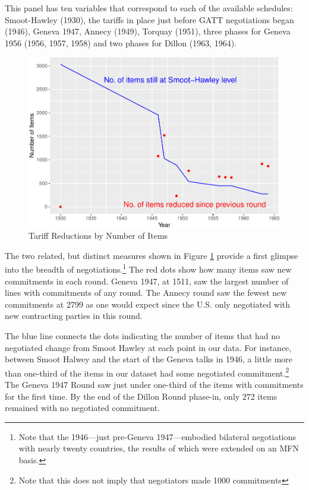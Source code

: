 \documentclass[
  12pt,
]{article}
\begin{document}
This panel has ten variables that correspond to each of the available schedules: Smoot-Hawley (1930), the tariffs in place just before GATT negotiations began (1946), Geneva 1947, Annecy (1949), Torquay (1951), three phases for Geneva 1956 (1956, 1957, 1958) and two phases for Dillon (1963, 1964).

\begin{figure}[!h]
\includegraphics{data-paper_files/figure-latex/ibi-1} \caption{Tariff Reductions by Number of Items}\label{fig:ibi}
\end{figure}

The two related, but distinct measures shown in Figure \ref{fig:ibi} provide a first glimpse into the breadth of negotiations.\footnote{Note that the 1946---just pre-Geneva 1947---embodied bilateral negotiations with nearly twenty countries, the results of which were extended on an MFN basis.} The red dots show how many items saw new commitments in each round. Geneva 1947, at 1511, saw the largest number of lines with commitments of any round. The Annecy round saw the fewest new commitments at 2799 as one would expect since the U.S. only negotiated with new contracting parties in this round.

The blue line connects the dots indicating the number of items that had no negotiated change from Smoot Hawley at each point in our data. For instance, between Smoot Halwey and the start of the Geneva talks in 1946, a little more than one-third of the items in our dataset had some negotiated commitment.\footnote{Note that this does not imply that negotiators made 1000 commitments} The Geneva 1947 Round saw just under one-third of the items with commitments for the first time. By the end of the Dillon Round phase-in, only 272 items remained with no negotiated commitment.
\end{document}
